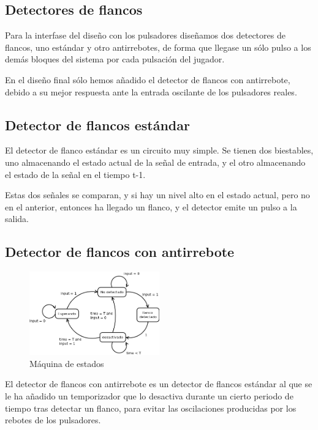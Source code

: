 \subsection{Detectores de flancos}
\label{edgeDetectors}

Para la interfase del diseño con los pulsadores diseñamos dos detectores de flancos, uno estándar y otro antirrebotes, de forma que llegase un sólo pulso a los demás bloques del sistema por cada pulsación del jugador.

En el diseño final sólo hemos añadido el detector de flancos con antirrebote, debido a su mejor respuesta ante la entrada oscilante de los pulsadores reales.

\subsection{Detector de flancos estándar}
\label{edgeDetectorStd}
El detector de flanco estándar es un circuito muy simple. Se tienen dos biestables, uno almacenando el estado actual de la señal de entrada, y el otro almacenando el estado de la señal en el tiempo t-1.

Estas dos señales se comparan, y si hay un nivel alto en el estado actual, pero no en el anterior, entonces ha llegado un flanco, y el detector emite un pulso a la salida.


\subsection{Detector de flancos con antirrebote}
\label{edgeDetectorDebounce}

\begin{figure}[H]
	\centering
	\includegraphics[width=0.5\textwidth]{edgeDetectorDebounceFSM.png}
	\caption{Máquina de estados}\label{fig:edgeDetectorDebounceFSM}
\end{figure}

El detector de flancos con antirrebote es un detector de flancos estándar al que se le ha añadido un temporizador que lo desactiva durante un cierto periodo de tiempo tras detectar un flanco, para evitar las oscilaciones producidas por los rebotes de los pulsadores.

